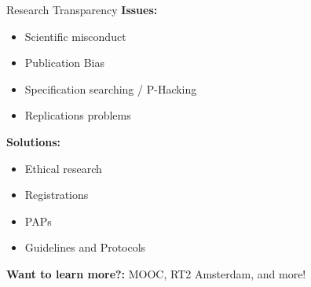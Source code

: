 \documentclass{beamer}
\begin{document}
\begin{frame}{Research Transparency}
\textbf{Issues:}
\begin{itemize}
\item Scientific misconduct
\item Publication Bias
\item Specification searching / P-Hacking
\item Replications problems
\end{itemize}
\textbf{Solutions:}
\begin{itemize}
\item Ethical research
\item Registrations
\item PAPs
\item Guidelines and Protocols
\end{itemize}
\medskip

\textbf{Want to learn more?:} MOOC, RT2 Amsterdam, and more! 
\end{frame}
\end{document}
